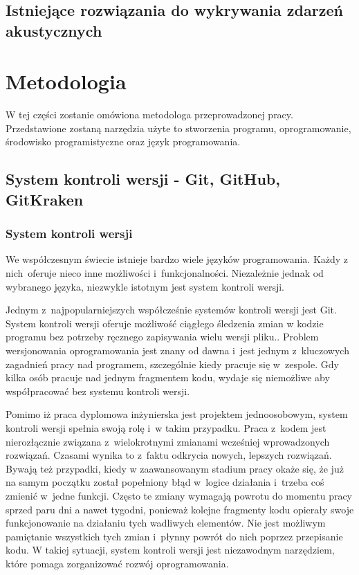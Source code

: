\documentclass[eng,printmode]{mgr}
\begin{document}
\section{Istniejące rozwiązania do wykrywania zdarzeń akustycznych}
\chapter{Metodologia}
W tej części zostanie omówiona metodologa przeprowadzonej pracy. Przedstawione zostaną narzędzia użyte to stworzenia programu, oprogramowanie, środowisko programistyczne oraz język programowania.
\section{System kontroli wersji - Git, GitHub, GitKraken}
\subsection{System kontroli wersji}
We współczesnym świecie istnieje bardzo wiele języków programowania. Każdy z nich~oferuje nieco inne możliwości i~funkcjonalności. Niezależnie jednak od wybranego języka, niezwykle istotnym jest system kontroli wersji. 

Jednym z~najpopularniejszych współcześnie systemów kontroli wersji jest Git. System kontroli wersji oferuje możliwość ciągłego śledzenia zmian w kodzie programu bez potrzeby ręcznego zapisywania wielu wersji pliku.\cite{Git}. Problem wersjonowania oprogramowania jest znany od dawna i~jest jednym z~kluczowych zagadnień pracy nad programem, szczególnie kiedy pracuje się w~zespole. Gdy kilka osób pracuje nad jednym fragmentem kodu, wydaje się niemożliwe aby współpracować bez systemu kontroli wersji.

Pomimo iż praca dyplomowa inżynierska jest projektem jednoosobowym, system kontroli wersji spełnia swoją rolę i~w takim przypadku. Praca z~kodem jest nierozłącznie związana z~wielokrotnymi zmianami wcześniej wprowadzonych rozwiązań. Czasami wynika to z~faktu odkrycia nowych, lepszych rozwiązań. Bywają też przypadki, kiedy w zaawansowanym stadium pracy okaże się, że już na samym początku został popełniony błąd w~logice działania i~trzeba coś zmienić w~jedne funkcji. Często te zmiany wymagają powrotu do momentu pracy sprzed paru dni a nawet tygodni, ponieważ kolejne fragmenty kodu opierały swoje funkcjonowanie na działaniu tych wadliwych elementów. Nie jest możliwym pamiętanie wszystkich tych zmian i~płynny powrót do nich poprzez przepisanie kodu. W takiej sytuacji, system kontroli wersji jest niezawodnym narzędziem, które pomaga zorganizować rozwój oprogramowania. 
\end{document}
